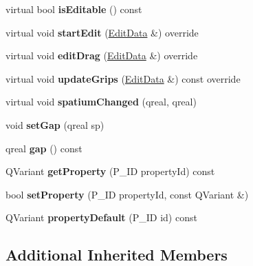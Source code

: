 \begin{DoxyCompactItemize}
virtual bool {\bfseries is\+Editable} () const
\item 
\mbox{\label{class_ms_1_1_spacer_aec3e0271fa9f59542c0b9bd62b20381b}} 
virtual void {\bfseries start\+Edit} (\hyperlink{class_ms_1_1_edit_data}{Edit\+Data} \&) override
\item 
\mbox{\label{class_ms_1_1_spacer_a89df271ee8ed3c981aa8669414d63fbf}} 
virtual void {\bfseries edit\+Drag} (\hyperlink{class_ms_1_1_edit_data}{Edit\+Data} \&) override
\item 
\mbox{\label{class_ms_1_1_spacer_a9d6770f1803c28806a3749977c6f241c}} 
virtual void {\bfseries update\+Grips} (\hyperlink{class_ms_1_1_edit_data}{Edit\+Data} \&) const override
\item 
\mbox{\label{class_ms_1_1_spacer_ac04289b67b44f6443b91da6acd5bbf3e}} 
virtual void {\bfseries spatium\+Changed} (qreal, qreal)
\item 
\mbox{\label{class_ms_1_1_spacer_a3f6e380b423fd5667e40c29ed1c63d04}} 
void {\bfseries set\+Gap} (qreal sp)
\item 
\mbox{\label{class_ms_1_1_spacer_a78bf0f34478639535d9ef1a11b12d37c}} 
qreal {\bfseries gap} () const
\item 
\mbox{\label{class_ms_1_1_spacer_a1061d86eb484acd2237afa808eada761}} 
Q\+Variant {\bfseries get\+Property} (P\+\_\+\+ID property\+Id) const
\item 
\mbox{\label{class_ms_1_1_spacer_a3fd7ef505720edf2c7ba74a35fcbbdbb}} 
bool {\bfseries set\+Property} (P\+\_\+\+ID property\+Id, const Q\+Variant \&)
\item 
\mbox{\label{class_ms_1_1_spacer_a6efaad2414efd311569e594e559b9179}} 
Q\+Variant {\bfseries property\+Default} (P\+\_\+\+ID id) const
\end{DoxyCompactItemize}
\subsection*{Additional Inherited Members}


